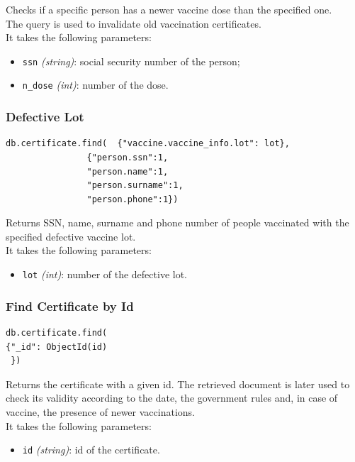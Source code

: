 \documentclass[12pt, a4paper]{article}
\begin{document}
\noindent %
Checks if a specific person has a newer vaccine dose than the specified one. \\
The query is used to invalidate old vaccination certificates. \\
It takes the following parameters:
\begin{itemize}
    \item \texttt{ssn} \emph{(string)}: social security number of the person;
    \item \texttt{n\_dose} \emph{(int)}: number of the dose.
\end{itemize}
		
\subsubsection{Defective Lot}
\begin{tcolorbox}[fontupper=\scriptsize]
    \begin{verbatim}
db.certificate.find(  {"vaccine.vaccine_info.lot": lot},
				{"person.ssn":1,
				"person.name":1,
				"person.surname":1,
				"person.phone":1})
    \end{verbatim}
\end{tcolorbox}

\noindent %
Returns SSN, name, surname and phone number of people vaccinated with the specified defective vaccine lot. \\
It takes the following parameters:
\begin{itemize}
    \item \texttt{lot} \emph{(int)}: number of the defective lot.
\end{itemize}

\subsubsection{Find Certificate by Id}
\begin{tcolorbox}[fontupper=\scriptsize]
    \begin{verbatim}
db.certificate.find(
{"_id": ObjectId(id)
 })
    \end{verbatim}
\end{tcolorbox}

\noindent %
Returns the certificate with a given id. The retrieved document is later used to check 
its validity according to the date, the government rules and, in case of vaccine, the presence of newer vaccinations. \\
It takes the following parameters:
\begin{itemize}
    \item \texttt{id} \emph{(string)}: id of the certificate.
\end{itemize}
\end{document}
